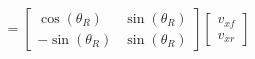 \documentclass[preview]{standalone}
\begin{document}
\begin{align*}
=\begin{bmatrix} \cos(\theta_R) &  \sin(\theta_R)\\ -\sin(\theta_R) & \sin(\theta_R) \end{bmatrix} \begin{bmatrix} v_{xf} \\ v_{xr} \end{bmatrix}
\end{align*}
\end{document}
